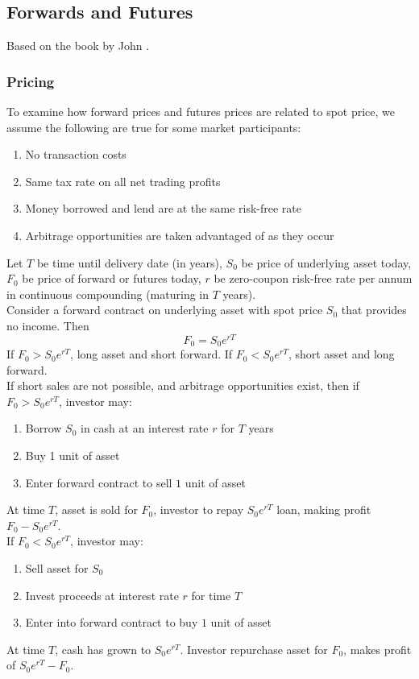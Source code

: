 \subsection{Forwards and Futures}

Based on the book by John \cite{hull_2021}.

\subsubsection{Pricing}

To examine how forward prices and futures prices are related to spot price, we assume the following are true for some market participants:
\begin{enumerate}[label=\roman*.]
\setlength{\itemsep}{0pt}
\item No transaction costs
\item Same tax rate on all net trading profits
\item Money borrowed and lend are at the same risk-free rate
\item Arbitrage opportunities are taken advantaged of as they occur
\end{enumerate}

Let $T$ be time until delivery date (in years), $S_0$ be price of underlying asset today, $F_0$ be price of forward or futures today, $r$ be zero-coupon risk-free rate per annum in continuous compounding (maturing in $T$ years).\\

Consider a forward contract on underlying asset with spot price $S_0$ that provides no income. Then
\begin{equation}
F_0 = S_0 e^{rT} \nonumber
\end{equation}
If $F_0 > S_0 e^{rT}$, long asset and short forward. If $F_0 < S_0 e^{rT}$, short asset and long forward.\\
If short sales are not possible, and arbitrage opportunities exist, then if $F_0 > S_0 e^{rT}$, investor may:
\begin{enumerate}[label=\arabic*.]
\setlength{\itemsep}{0pt}
\item Borrow $S_0$ in cash at an interest rate $r$ for $T$ years
\item Buy 1 unit of asset
\item Enter forward contract to sell $1$ unit of asset
\end{enumerate}
At time $T$, asset is sold for $F_0$, investor to repay $S_0 e^{rT}$ loan, making profit $F_0 - S_0 e^{rT}$.\\
If $F_0 < S_0 e^{rT}$, investor may:
\begin{enumerate}[label=\arabic*.]
\setlength{\itemsep}{0pt}
\item Sell asset for $S_0$
\item Invest proceeds at interest rate $r$ for time $T$
\item Enter into forward contract to buy $1$ unit of asset
\end{enumerate}
At time $T$, cash has grown to $S_0 e^{rT}$. Investor repurchase asset for $F_0$, makes profit of $S_0 e^{rT} - F_0$.\\

